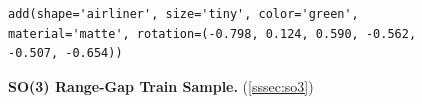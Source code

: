 \begin{figure}
\centering
{}
\begin{verbatim}
add(shape='airliner', size='tiny', color='green', material='matte', rotation=(-0.798, 0.124, 0.590, -0.562, -0.507, -0.654))
\end{verbatim}
\caption{\textbf{SO(3) Range-Gap Train Sample.} (\cref{sssec:so3})}
\label{fig:code_so3}
\end{figure}